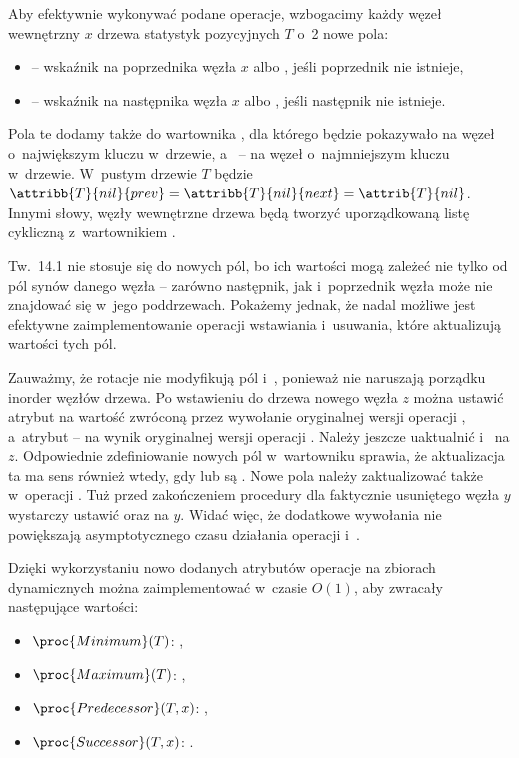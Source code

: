 
\exercise %
Aby efektywnie wykonywać podane operacje, wzbogacimy każdy węzeł wewnętrzny $x$ drzewa statystyk pozycyjnych $T$ o~2 nowe pola:
\begin{itemize}
	\item {} -- wskaźnik na poprzednika węzła $x$ albo , jeśli poprzednik nie istnieje,
	\item {} -- wskaźnik na następnika węzła $x$ albo , jeśli następnik nie istnieje.
\end{itemize}
Pola te dodamy także do wartownika , dla którego  będzie pokazywało na węzeł o~największym kluczu w~drzewie, a~ -- na węzeł o~najmniejszym kluczu w~drzewie.
W~pustym drzewie $T$ będzie $\attribb{T}{nil}{prev}=\attribb{T}{nil}{next}=\attrib{T}{nil}$.
Innymi słowy, węzły wewnętrzne drzewa będą tworzyć uporządkowaną listę cykliczną z~wartownikiem .

Tw.\ 14.1 nie stosuje się do nowych pól, bo ich wartości mogą zależeć nie tylko od pól synów danego węzła -- zarówno następnik, jak i~poprzednik węzła może nie znajdować się w~jego poddrzewach.
Pokażemy jednak, że nadal możliwe jest efektywne zaimplementowanie operacji wstawiania i~usuwania, które aktualizują wartości tych pól.

Zauważmy, że rotacje nie modyfikują pól  i~, ponieważ nie naruszają porządku inorder węzłów drzewa.
Po wstawieniu do drzewa nowego węzła $z$ można ustawić atrybut  na wartość zwróconą przez wywołanie oryginalnej wersji operacji , a~atrybut  -- na wynik oryginalnej wersji operacji .
Należy jeszcze uaktualnić  i~ na $z$.
Odpowiednie zdefiniowanie nowych pól w~wartowniku sprawia, że aktualizacja ta ma sens również wtedy, gdy  lub  są .
Nowe pola należy zaktualizować także w~operacji .
Tuż przed zakończeniem procedury dla faktycznie usuniętego węzła $y$ wystarczy ustawić  oraz  na $y$.
Widać więc, że dodatkowe wywołania nie powiększają asymptotycznego czasu działania operacji  i~.

Dzięki wykorzystaniu nowo dodanych atrybutów operacje na zbiorach dynamicznych można zaimplementować w~czasie $O(1)$, aby zwracały następujące wartości:
\begin{itemize}
	\item $\proc{Minimum}(T)$: ,
	\item $\proc{Maximum}(T)$: ,
	\item $\proc{Predecessor}(T,x)$: ,
	\item $\proc{Successor}(T,x)$: .
\end{itemize}

